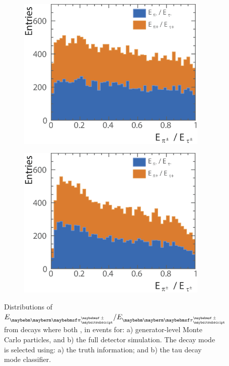 \begin{figure}[htbp]
\centering %
\begin{subfigure}[b]{0.45\textwidth}
  \includegraphics[width=\textwidth]{tau/NoTimeAnalysis/1DMC2}
  \caption{}
  \label{fig:TauSpin1DMC}
\end{subfigure}
\begin{subfigure}[b]{0.45\textwidth}
  \includegraphics[width=\textwidth]{tau/NoTimeAnalysis/1DrecoNoOverflow2}
  \caption{}
  \label{fig:TauSpin1Dreco}
\end{subfigure}
\caption
{Distributions of $E_{\Ppipm}/E_{\Ptaupm}$ from \ZToTauTau decays where both \tauToPionBoth, in \eeZZQQ events for: a) generator-level  Monte Carlo particles, and b) the full detector simulation. The \tauToPionBoth decay mode is selected using: a) the truth information; and b) the tau decay mode classifier.}
\label{fig:TauSpin1D}
\end{figure}



